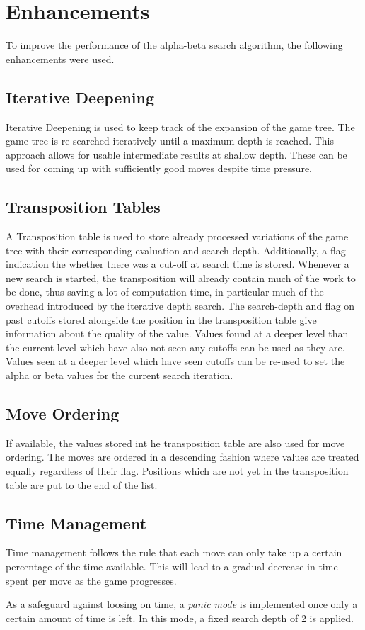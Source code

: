 \section{Enhancements}

To improve the performance of the alpha-beta search algorithm, the following enhancements were used.

\subsection{Iterative Deepening}
Iterative Deepening is used to keep track of the expansion of the game tree. The game tree is re-searched iteratively until a maximum depth is reached. This approach allows for usable intermediate results at shallow depth. These can be used for coming up with sufficiently good moves despite time pressure.

\subsection{Transposition Tables}

A Transposition table is used to store already processed variations of the game tree with their corresponding evaluation and search depth. Additionally, a flag indication the whether there was a cut-off at search time is stored. Whenever a new search is started, the transposition will already contain much of the work to be done, thus saving a lot of computation time, in particular much of the overhead introduced by the iterative depth search. The search-depth and flag on past cutoffs stored alongside the position in the transposition table give information about the quality of the value. Values found at a deeper level than the current level which have also not seen any cutoffs can be used as they are. Values seen at a deeper level which have seen cutoffs can be re-used to set the alpha or beta values for the current search iteration.

\subsection{Move Ordering}
If available, the values stored int he transposition table are also used for move ordering. The moves are ordered in a descending fashion where values are treated equally regardless of their flag. Positions which are not yet in the transposition table are put to the end of the list.

\subsection{Time Management}
Time management follows the rule that each move can only take up a certain percentage of the time available. This will lead to a gradual decrease in time spent per move as the game progresses.

As a safeguard against loosing on time, a \textit{panic mode} is implemented once only a certain amount of time is left. In this mode, a fixed search depth of 2 is applied.